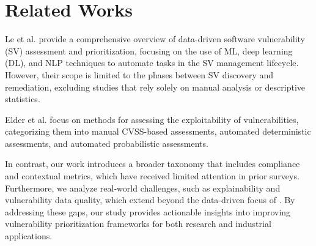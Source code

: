 \section{Related Works}
Le et al. \cite{le2022survey} provide a comprehensive overview of data-driven software vulnerability (SV) assessment and prioritization, focusing on the use of ML, deep learning (DL), and NLP techniques to automate tasks in the SV management lifecycle. However, their scope is limited to the phases between SV discovery and remediation, excluding studies that rely solely on manual analysis or descriptive statistics.

Elder et al. \cite{elder2024survey} focus on methods for assessing the exploitability of vulnerabilities, categorizing them into manual CVSS-based assessments, automated deterministic assessments, and automated probabilistic assessments.

In contrast, our work introduces a broader taxonomy that includes compliance and contextual metrics, which have received limited attention in prior surveys. Furthermore, we analyze real-world challenges, such as explainability and vulnerability data quality, which extend beyond the data-driven focus of \cite{le2022survey}. By addressing these gaps, our study provides actionable insights into improving vulnerability prioritization frameworks for both research and industrial applications.